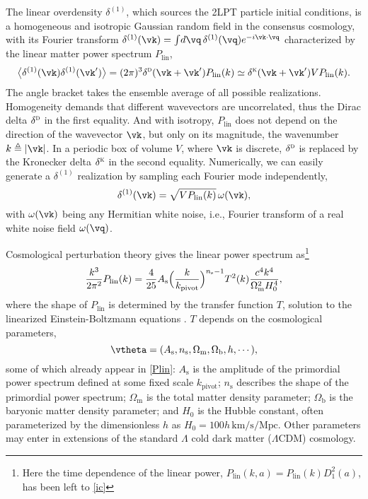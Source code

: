 \documentclass[modern, trackchanges, dvipsnames]{aastex631}
\newcommand{\deltaD}{\delta^\textsc{d}}
\newcommand{\deltaK}{\delta^\textsc{k}}
\renewcommand{\d}{d}
\newcommand{\As}{A_\mathrm{s}}
\newcommand{\ns}{n_\mathrm{s}}
\newcommand{\Omegam}{\Omega_\mathrm{m}}
\newcommand{\Omegab}{\Omega_\mathrm{b}}
\newcommand{\Mpc}{\mathrm{Mpc}}
\newcommand{\Plin}{P_\mathrm{lin}}
\begin{document}
The linear overdensity $\delta^{(1)}$, which sources the 2LPT particle
initial conditions, is a homogeneous and isotropic Gaussian random field
in the consensus cosmology, with its Fourier transform
$\delta^{(1)}(\vk) = \int\!\d\vq\, \delta^{(1)}(\vq) e^{- i \vk \cdot
\vq}$ characterized by the linear matter power spectrum $\Plin$,
%
\begin{equation}
\bigl\langle \delta^{(1)}(\vk) \delta^{(1)}(\vk') \bigr\rangle
= (2\pi)^3 \deltaD(\vk + \vk') \Plin(k)
\simeq \deltaK(\vk + \vk') V \Plin(k).
\end{equation}
%
The angle bracket takes the ensemble average of all possible
realizations.
Homogeneity demands that different wavevectors are uncorrelated, thus
the Dirac delta $\deltaD$ in the first equality.
And with isotropy, $\Plin$ does not depend on the direction of the
wavevector $\vk$, but only on its magnitude, the wavenumber $k
\triangleq |\vk|$.
In a periodic box of volume $V$, where $\vk$ is discrete, $\deltaD$ is
replaced by the Kronecker delta $\deltaK$ in the second equality.
Numerically, we can easily generate a $\delta^{(1)}$ realization by
sampling each Fourier mode independently,
%
\begin{equation}
\delta^{(1)}(\vk) = \sqrt{V \Plin(k)} \, \omega(\vk),
\end{equation}
%
with $\omega(\vk)$ being any Hermitian white noise, i.e., Fourier
transform of a real white noise field $\omega(\vq)$.

Cosmological perturbation theory gives the linear power spectrum
as\footnote{Here the time dependence of the linear power, $\Plin(k, a) =
\Plin(k) D_1^2(a)$, has been left to \eqref{ic}}
%
\begin{equation}
\frac{k^3}{2\pi^2} \Plin(k)
= \frac{4}{25} \As
  \Bigl( \frac{k}{k_\mathrm{pivot}} \Bigr)^{\ns - 1}
  T^2(k) \frac{c^4 k^4}{\Omegam^2 H_0^4},
\label{Plin}
\end{equation}
%
where the shape of $\Plin$ is determined by the transfer function $T$,
solution to the linearized Einstein-Boltzmann equations \citep{CAMB,
CLASS}.
$T$ depends on the cosmological parameters,
%
\begin{equation*}
\vtheta = (
  \As, \ns, \Omegam, \Omegab, h, \cdots),
\end{equation*}
%
some of which already appear in \eqref{Plin}: $\As$ is the amplitude of
the primordial power spectrum defined at some fixed scale
$k_\mathrm{pivot}$; $\ns$ describes the shape of the primordial power
spectrum; $\Omegam$ is the total matter density parameter; $\Omegab$ is
the baryonic matter density parameter; and $H_0$ is the Hubble constant,
often parameterized by the dimensionless $h$ as $H_0 = 100 h \,
\mathrm{km}/\mathrm{s}/\Mpc$.
Other parameters may enter in extensions of the standard $\Lambda$ cold
dark matter ($\Lambda$CDM) cosmology.
\end{document}
